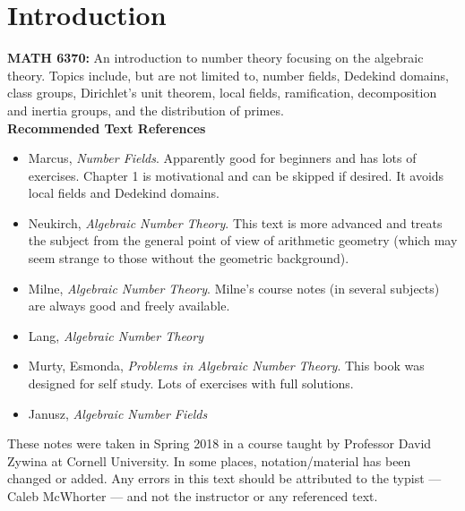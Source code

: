 
\section{Introduction}

\noindent\textbf{MATH 6370:} An introduction to number theory focusing on the algebraic theory. Topics include, but are not limited to, number fields, Dedekind domains, class groups, Dirichlet's unit theorem, local fields, ramification, decomposition and inertia groups, and the distribution of primes. \\

\noindent \textbf{Recommended Text References}

\begin{itemize}
\item Marcus, \emph{Number Fields}. Apparently good for beginners and has lots of exercises. Chapter 1 is motivational and can be skipped if desired. It avoids local fields and Dedekind domains.

\item Neukirch, \emph{Algebraic Number Theory}. This text is more advanced and treats the subject from the general point of view of arithmetic geometry (which may seem strange to those without the geometric background).

\item Milne, \emph{Algebraic Number Theory}. Milne's course notes (in several subjects) are always good and freely available.

\item Lang, \emph{Algebraic Number Theory}

\item Murty, Esmonda, \emph{Problems in Algebraic Number Theory}. This book was designed for self study. Lots of exercises with full solutions.

\item Janusz, \emph{Algebraic Number Fields}
\end{itemize}

These notes were taken in Spring 2018 in a course taught by Professor David Zywina at Cornell University. In some places, notation/material has been changed or added. Any errors in this text should be attributed to the typist --- Caleb McWhorter --- and not the instructor or any referenced text. 

\newpage